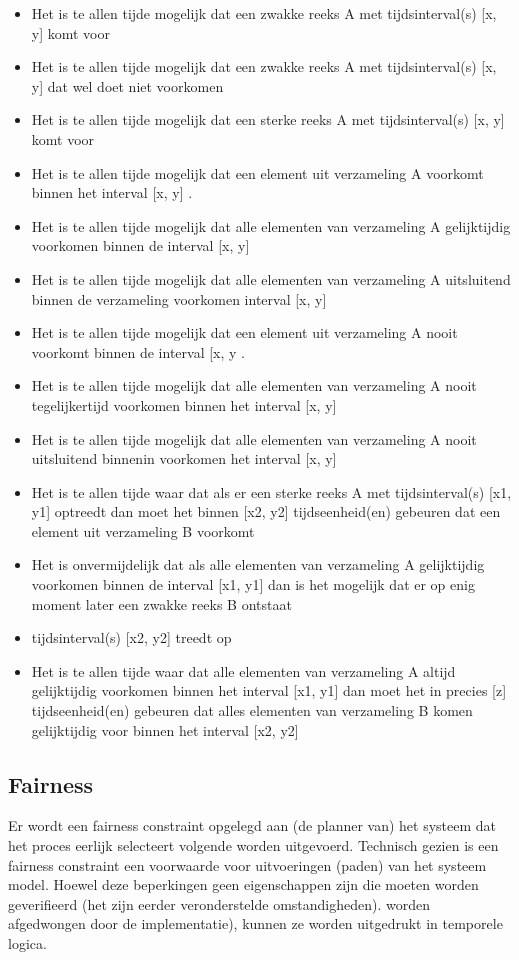 \documentclass{article}
\begin{document}
	\begin{itemize}
		\item Het is te allen tijde mogelijk dat een zwakke reeks A met tijdsinterval(s) [x, y]
		komt voor
		\item Het is te allen tijde mogelijk dat een zwakke reeks A met tijdsinterval(s) [x, y] dat wel doet
		niet voorkomen
		\item Het is te allen tijde mogelijk dat een sterke reeks A met tijdsinterval(s) [x, y]
		komt voor
		\item Het is te allen tijde mogelijk dat een element uit verzameling A voorkomt binnen het interval [x, y]
		.
		\item  Het is te allen tijde mogelijk dat alle elementen van verzameling A gelijktijdig voorkomen binnen de
		interval [x, y]
		\item Het is te allen tijde mogelijk dat alle elementen van verzameling A uitsluitend binnen de verzameling voorkomen
		interval [x, y]
		\item Het is te allen tijde mogelijk dat een element uit verzameling A nooit voorkomt binnen de
		interval [x, y
		.
		\item  Het is te allen tijde mogelijk dat alle elementen van verzameling A nooit tegelijkertijd voorkomen
		binnen het interval [x, y]
		\item Het is te allen tijde mogelijk dat alle elementen van verzameling A nooit uitsluitend binnenin voorkomen
		het interval [x, y]
		\item Het is te allen tijde waar dat als er een sterke reeks A met tijdsinterval(s) [x1, y1] optreedt
		dan moet het binnen [x2, y2] tijdseenheid(en) gebeuren dat een element uit verzameling B voorkomt
		\item Het is onvermijdelijk dat als alle elementen van verzameling A gelijktijdig voorkomen binnen de
		interval [x1, y1] dan is het mogelijk dat er op enig moment later een zwakke reeks B ontstaat
		\item tijdsinterval(s) [x2, y2] treedt op
		\item  Het is te allen tijde waar dat alle elementen van verzameling A altijd gelijktijdig voorkomen
		binnen het interval [x1, y1] dan moet het in precies [z] tijdseenheid(en) gebeuren dat alles
		elementen van verzameling B komen gelijktijdig voor binnen het interval [x2, y2]
		
	\end{itemize}
	
	
	
	\subsection{Fairness}
	Er wordt een fairness constraint opgelegd aan (de planner van) het systeem dat het proces eerlijk selecteert
	volgende worden uitgevoerd. Technisch gezien is een fairness constraint een voorwaarde voor uitvoeringen (paden) van het systeem
	model. Hoewel deze beperkingen geen eigenschappen zijn die moeten worden geverifieerd (het zijn eerder veronderstelde omstandigheden).
	worden afgedwongen door de implementatie), kunnen ze worden uitgedrukt in temporele logica.
	
\end{document}
